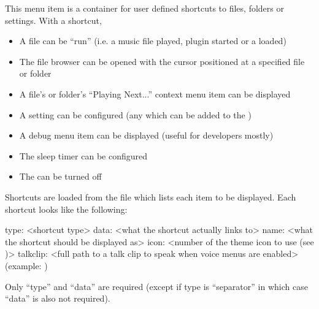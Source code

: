 This menu item is a container for user defined shortcuts to files, folders or
settings. With a shortcut,
\begin{itemize}
  \item A file can be ``run'' (i.e. a music file played, plugin started or
        a  loaded)
  \item The file browser can be opened with the cursor positioned at
        a specified file or folder
  \item A file's or folder's ``Playing Next...'' context menu item can
        be displayed
  \item A setting can be configured (any which can be added to the
        )
  \item A debug menu item can be displayed (useful for developers mostly)
  \item The sleep timer can be configured
  \item The \dap{} can be turned off
\end{itemize}


Shortcuts are loaded from the file  which lists
each item to be displayed. Each shortcut looks like the following:

\begin{example}
    [shortcut]
    type: <shortcut type>
    data: <what the shortcut actually links to>
    name: <what the shortcut should be displayed as>
    icon: <number of the theme icon to use (see )>
    talkclip: <full path to a talk clip to speak when voice menus are enabled> (example: )
\end{example}

Only ``type'' and ``data'' are required (except if type is ``separator'' in which case
``data'' is also not required).


